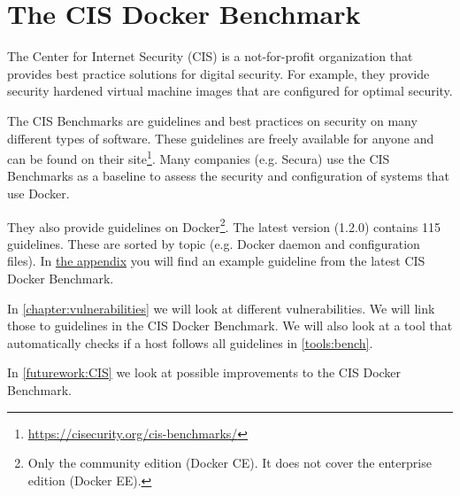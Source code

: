 \section{The CIS Docker Benchmark}
The Center for Internet Security (CIS) is a not-for-profit organization that provides best practice solutions for digital security. For example, they provide security hardened virtual machine images that are configured for optimal security.

\medskip

The CIS Benchmarks are guidelines and best practices on security on many different types of software. These guidelines are freely available for anyone and can be found on their site\footnote{\url{https://cisecurity.org/cis-benchmarks/}}. Many companies (e.g. Secura) use the CIS Benchmarks as a baseline to assess the security and configuration of systems that use Docker.

\medskip

They also provide guidelines on Docker\footnote{Only the community edition (Docker CE). It does not cover the enterprise edition (Docker EE).}. The latest version (1.2.0) contains 115 guidelines. These are sorted by topic (e.g. Docker daemon and configuration files). In \hyperref[appendix:CIS-Benchmark-Example]{the appendix} you will find an example guideline from the latest CIS Docker Benchmark.

In \autoref{chapter:vulnerabilities} we will look at different vulnerabilities. We will link those to guidelines in the CIS Docker Benchmark. We will also look at a tool that automatically checks if a host follows all guidelines in \autoref{tools:bench}.

In \autoref{futurework:CIS} we look at possible improvements to the CIS Docker Benchmark.

